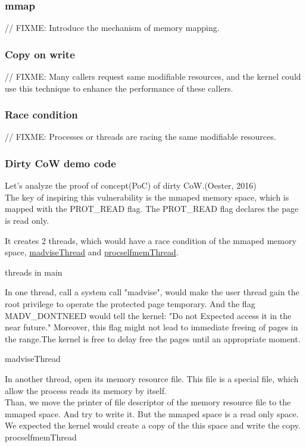 \documentclass[12pt,a4paper,oneside,draft]{IEEEconf}
\begin{document}
\subsubsection{mmap}
// FIXME: Introduce the mechanism of memory mapping.

\subsubsection{Copy on write}
// FIXME: Many callers request same modifiable resources, and the kernel could use this
technique to enhance the performance of these callers.

\subsubsection{Race condition}
// FIXME: Processes or threads are racing the same modifiable resources.


\subsubsection{\hypertarget{dirty cow}{Dirty CoW} demo code\cite{Dirty_CoW}}
Let's analyze the proof of concept(PoC) of dirty CoW.(Oester, 2016)\\
The key of inspiring this vulnerability is the mmaped memory space, which is mapped with
the PROT\_READ flag. The PROT\_READ flag declares the page is read only.


It creates 2 threads, which would have a race condition of the mmaped memory space,
\hyperlink{madvise}{madviseThread} and \hyperlink{procself}{procselfmemThread}.

\hypertarget{threads_main}{threads in main}


In one thread, call a system call "madvise", would make the user thread gain the root
privilege to operate the protected page temporary. And the flag MADV\_DONTNEED would
tell the kernel: "Do not Expected access it in the near future.\cite{Madvise}" Moreover,
this flag might not lead to immediate freeing of pages in the range.The kernel is free
to delay free the pages until an appropriate moment.\cite{Madvise}

\hypertarget{madvise}{madviseThread}


In another thread, open its memory resource file. This file is a special file, which allow
the process reads its memory by itself.\\
Than, we move the printer of file descriptor of the memory resource file to the mmaped
space. And try to write it. But the mmaped space is a read only space. We expected the
kernel would create a copy of the this space and write the copy\cite{root_exploit}.
\hypertarget{procself}{procselfmemThread}

\end{document}
